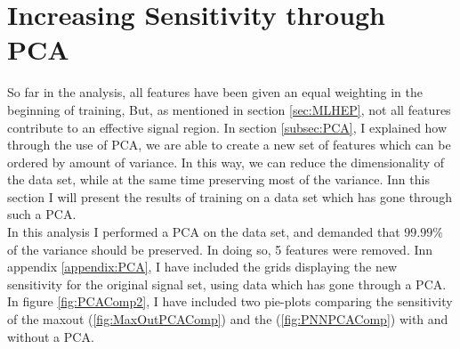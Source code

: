\section{Increasing Sensitivity through PCA}\label{sec:PCA}
So far in the analysis, all features have been given an equal weighting in the beginning of training,
But, as mentioned in section \ref{sec:MLHEP}, not all features contribute to an effective signal 
region. In section \ref{subsec:PCA}, I explained how through the use of \ac{PCA}, we are able to 
create a new set of features which can be ordered by amount of variance. In this way, we can reduce
the dimensionality of the data set, while at the same time preserving most of the variance. Inn this 
section I will present the results of training on a data set which has gone through such a \ac{PCA}.
\\
In this analysis I performed a \ac{PCA} on the data set, and demanded that $99.99\%$ of the variance 
should be preserved. In doing so, 5 features were removed. Inn appendix \ref{appendix:PCA}, I have included 
the grids displaying the new sensitivity for the original signal set, using data which has gone through a \ac{PCA}. 
In figure \ref{fig:PCAComp2}, I have included two pie-plots comparing the sensitivity of the maxout (\ref{fig:MaxOutPCAComp})
and the (\ref{fig:PNNPCAComp}) with and without a \ac{PCA}.\\
